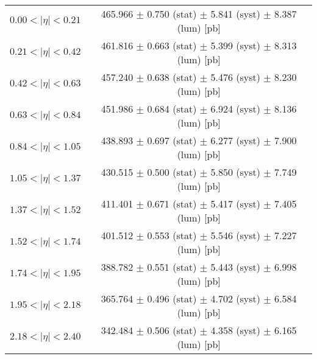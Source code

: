 \begin{tabular}{lc}
\hline
$0.00 < |\eta| <0.21$          & 465.966 $\pm$ 0.750 (stat) $\pm$ 5.841 (syst) $\pm$ 8.387 (lum) [pb]  \\
$0.21 < |\eta| <0.42$          & 461.816 $\pm$ 0.663 (stat) $\pm$ 5.399 (syst) $\pm$ 8.313 (lum) [pb]  \\
$0.42 < |\eta| <0.63$          & 457.240 $\pm$ 0.638 (stat) $\pm$ 5.476 (syst) $\pm$ 8.230 (lum) [pb]  \\
$0.63 < |\eta| <0.84$          & 451.986 $\pm$ 0.684 (stat) $\pm$ 6.924 (syst) $\pm$ 8.136 (lum) [pb]  \\
$0.84 < |\eta| <1.05$          & 438.893 $\pm$ 0.697 (stat) $\pm$ 6.277 (syst) $\pm$ 7.900 (lum) [pb]  \\
$1.05 < |\eta| <1.37$          & 430.515 $\pm$ 0.500 (stat) $\pm$ 5.850 (syst) $\pm$ 7.749 (lum) [pb]  \\
$1.37 < |\eta| <1.52$          & 411.401 $\pm$ 0.671 (stat) $\pm$ 5.417 (syst) $\pm$ 7.405 (lum) [pb]  \\
$1.52 < |\eta| <1.74$          & 401.512 $\pm$ 0.553 (stat) $\pm$ 5.546 (syst) $\pm$ 7.227 (lum) [pb]  \\
$1.74 < |\eta| <1.95$          & 388.782 $\pm$ 0.551 (stat) $\pm$ 5.443 (syst) $\pm$ 6.998 (lum) [pb]  \\
$1.95 < |\eta| <2.18$          & 365.764 $\pm$ 0.496 (stat) $\pm$ 4.702 (syst) $\pm$ 6.584 (lum) [pb]  \\
$2.18 < |\eta| <2.40$          & 342.484 $\pm$ 0.506 (stat) $\pm$ 4.358 (syst) $\pm$ 6.165 (lum) [pb]  \\
\hline
\end{tabular}
